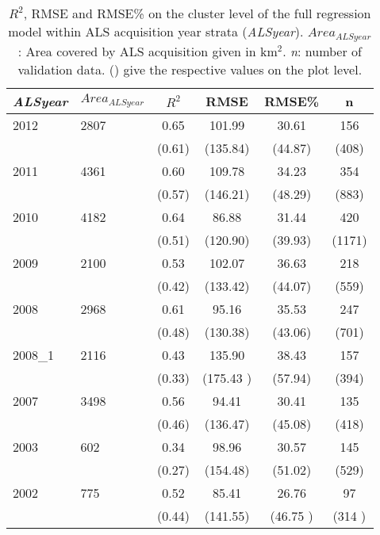 \begin{table}[ht]
	\begin{center}
		\caption{$R^2$, RMSE and RMSE\% on the cluster level of the full regression model within ALS acquisition year strata (\textit{ALSyear}). $Area_{ALSyear}$: Area covered by ALS acquisition given in km$^2$. \textit{n}: number of validation data. () give the respective values on the plot level.}
		\label{tab:adj_r2_within}
		{\small %
			\begin{tabular}{llcccc}
				\hline
				\textit{ALSyear} & $Area_{ALSyear}$ & $R^2$ & RMSE & RMSE\% & n \\ 
				\hline \hline
				2012  & 2807  &  0.65  &  101.99  &  30.61  &  156  \\ 
				&&             (0.61) & (135.84) & (44.87) & (408) \\ \hline

				2011  & 4361  &  0.60   & 109.78   &  34.23  & 354  \\ 
				&&             (0.57)  & (146.21) & (48.29) & (883) \\ \hline

				2010 & 4182     & 0.64  & 86.88   & 31.44  & 420 \\ 
				&&             (0.51)  & (120.90) & (39.93) & (1171) \\ \hline
  
				2009 & 2100     & 0.53  & 102.07  & 36.63  & 218  \\   
				&&             (0.42)  & (133.42) & (44.07) & (559) \\ \hline
             
				2008 & 2968     & 0.61  & 95.16   & 35.53  & 247  \\        
				&&             (0.48)  & (130.38) & (43.06) & (701) \\ \hline
	                    
				2008\_1 & 2116  & 0.43  & 135.90  & 38.43  & 157  \\      
				&&             (0.33)  & (175.43 ) & (57.94) & (394) \\ \hline
         
				2007 & 3498     & 0.56  & 94.41   & 30.41   & 135 \\ 
				&&             (0.46)  & (136.47)  & (45.08) & (418) \\ \hline
	
				2003 & 602      & 0.34  & 98.96   & 30.57  & 145  \\ 
				&&             (0.27)  & (154.48) & (51.02) & (529) \\ \hline
		
				2002 & 775      & 0.52  & 85.41  & 26.76   & 97  \\ 
				&&             (0.44) & (141.55) & (46.75 ) & (314 ) \\
				\hline
				\hline
			\end{tabular}
		}%
	\end{center}
\end{table}



